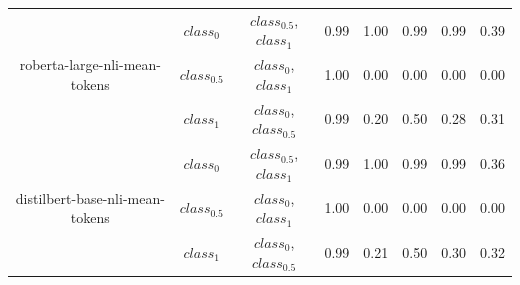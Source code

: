 \documentclass{ieeeaccess}
\begin{document}
\begin{table}[h!]
\begin{tabular}{|c|c|c|l|l|l|l|l|}
		\multirow{3}{*}{roberta-large-nli-mean-tokens}        & $class_0$                     & $class_{0.5}$,$class_1$                   & 0.99                                   & 1.00                                    & 0.99                                 & 0.99                              & 0.39                              \\ \cline{2-8} 
		& $class_{0.5}$                     & $class_0$,$class_1$                   & 1.00                                   & 0.00                                    & 0.00                                 & 0.00                              & 0.00                              \\ \cline{2-8} 
		& $class_1$                       & $class_0$,$class_{0.5}$                & 0.99                                   & 0.20                                    & 0.50                                 & 0.28                              & 0.31                              \\ \hline
		\multirow{3}{*}{distilbert-base-nli-mean-tokens}      & $class_0$                     & $class_{0.5}$,$class_1$                   & 0.99                                   & 1.00                                    & 0.99                                 & 0.99                              & 0.36                              \\ \cline{2-8} 
		& $class_{0.5}$                     & $class_0$,$class_1$                   & 1.00                                   & 0.00                                    & 0.00                                 & 0.00                              & 0.00                              \\ \cline{2-8} 
		& $class_1$                       & $class_0$,$class_{0.5}$           & 0.99                                   & 0.21                                    & 0.50                                 & 0.30                              & 0.32                              \\ \hline
	\end{tabular}
\end{table}
\end{document}
